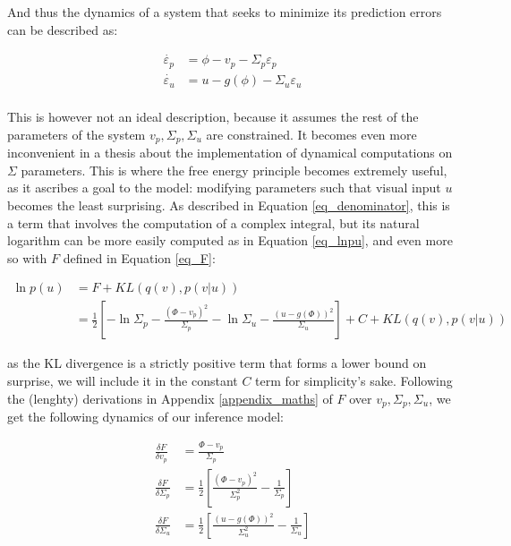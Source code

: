 And thus the dynamics of a system that seeks to minimize its prediction errors can be described as: 

\begin{equation}
\begin{aligned}
\dot{\varepsilon_p} &= \phi - v_p - \varSigma_p \varepsilon_p  \\
\dot{\varepsilon_u} &= u - g(\phi) - \varSigma_u \varepsilon_u  \\
\end{aligned}
\end{equation}

This is however not an ideal description, because it assumes the rest of the parameters of the system $v_p, \Sigma_p, \Sigma_u$ are constrained. It becomes even more inconvenient in a thesis about the implementation of dynamical computations on $\Sigma$ parameters. This is where the free energy principle becomes extremely useful, as it ascribes a goal to the model: modifying parameters such that visual input $u$ becomes the least surprising. As described in Equation \ref{eq_denominator}, this is a term that involves the computation of a complex integral, but its natural logarithm can be more easily computed as in Equation \ref{eq_lnpu}, and even more so with $F$ defined in Equation \ref{eq_F}:

\begin{equation}
\begin{aligned}
    \ln p(u) & = F+ KL (q(v), p(v|u)) \\
            & = \frac{1}{2} \left[ - \ln \Sigma_p - \frac{(\Phi - v_p)^2}{\Sigma_p}  - \ln \Sigma_u - \frac{(u - g(\Phi))^2}{\Sigma_u}\right] + C + KL (q(v), p(v|u))
\end{aligned}
\end{equation}

as the \gls{KL} divergence is a strictly positive term that forms a lower bound on surprise, we will include it in the constant $C$ term for simplicity's sake. Following the (lenghty) derivations in Appendix \ref{appendix_maths} of $F$ over $v_p, \Sigma_p, \Sigma_u$, we get the following dynamics of our inference model:

\begin{equation}
\label{eq_df_derror}
    \begin{aligned}
    \frac{\delta F}{\delta v_p} &= \frac{\Phi - v_p}{{\Sigma_p}} \\
    \frac{\delta F}{\delta \Sigma_p} &= \frac{1}{2} \left[ \frac{(\Phi - v_p)^2}{{\Sigma_p^2}} - \frac{1}{{\Sigma_p}} \right] \\
    \frac{\delta F}{\delta \Sigma_u} &=  \frac{1}{2} \left[ \frac{(u - g(\Phi))^2}{{\Sigma_u^2}} - \frac{1}{{\Sigma_u}} \right]
    \end{aligned}
\end{equation}

